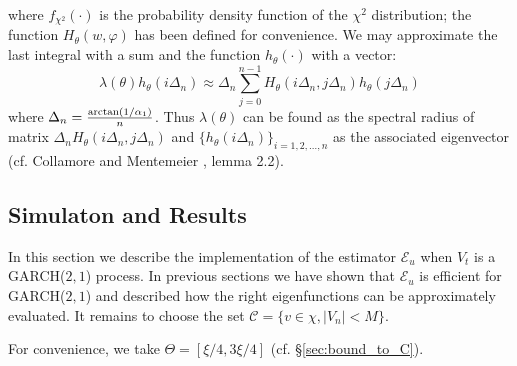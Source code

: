 where $f_{\chi^2}(\cdot)$ is the probability density function of the
$\chi^2$ distribution; the function $H_\theta(w, \varphi)$ has been defined
for convenience.
We may approximate the last integral with a sum and the function
$h_\theta(\cdot)$ with a vector:
\[
\lambda(\theta) h_\theta(i \Delta_n)
\approx
\Delta_n \sum_{j=0}^{n-1} H_\theta(i \Delta_n, j \Delta_n) h_\theta(j \Delta_n)
\]
where $\Delta_n = {\arctan(1/\alpha_1) \over n}$.
Thus $\lambda(\theta)$ can be found as the spectral radius of 
matrix $\Delta_n H_\theta(i \Delta_n, j \Delta_n)$ and 
$\{h_\theta(i \Delta_n)\}_ {i=1,2,\dots, n}$ as the associated
eigenvector (cf. Collamore and Mentemeier
\cite{collamore:mentemeier:2016}, lemma 2.2).

\subsection{Simulaton and Results}
In this section we describe the implementation of the estimator
$\mathcal E_u$ when $V_t$ is a GARCH($2, 1$) process. In previous
sections we have shown that $\mathcal E_u$ is efficient for
GARCH($2, 1$) and described how the right eigenfunctions can be
approximately evaluated. It remains to choose the set
$\mathcal C = \{v \in \chi, |V_n| < M\}$.

For convenience, we take $\Theta = [\xi/4, 3\xi/4]$
(cf. \S\ref{sec:bound_to_C}).



  

